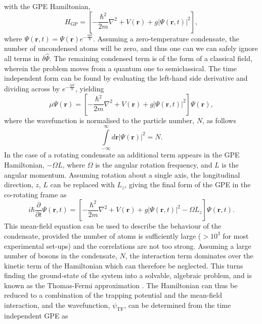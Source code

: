 with the GPE Hamiltonian,
\begin{equation}\label{eqn:h_gp}
H_{\textrm{GP}} = \left[-\frac{\hbar^2}{2m}\nabla^2 + V(\textbf{r}) + g\vert\Psi(\textbf{r},t)\vert^2 \right],
\end{equation}
where $\Psi(\textbf{r},t) = \Psi(\textbf{r})e^{-\frac{i\mu t}{\hbar}}$.
Assuming a zero-temperature condensate, the number of uncondensed atoms will be zero, and thus one can we can safely ignore all terms in $\delta\hat{\Psi}$. The remaining condensed term is of the form of a classical field, wherein the problem moves from a quantum one to semiclassical. The time independent form can be found by evaluating the left-hand side derivative and dividing across by $e^{-\frac{i\mu t}{\hbar}}$, yielding
\begin{equation}
\mu\Psi(\textbf{r}) = \left[-\frac{\hbar^2}{2m}\nabla^2 + V(\textbf{r}) + g\vert\Psi(\textbf{r},t)\vert^2 \right]\Psi(\textbf{r}),
\end{equation}
where the wavefunction is normalised to the particle number, $N$, as follows
\begin{equation}\label{eqn:norm}
\displaystyle\int\limits_{-\infty}^{\infty}d\textbf{r} \left\vert \Psi\left(\textbf{r}\right) \right\vert^2 = N.
\end{equation}
In the case of a rotating condensate an additional term appears in the GPE Hamiltonian, $-\Omega L$, where $\Omega$ is the angular rotation frequency, and $L$ is the angular momentum. Assuming rotation about a single axis, the longitudinal direction, $z$, $L$ can be replaced with $L_z$, giving the final form of the GPE in the co-rotating frame as
\begin{equation}\label{eqn:gpe_rotation}
i\hbar\frac{\partial}{\partial t}\Psi(\textbf{r},t) = \left[-\frac{\hbar^2}{2m}\nabla^2 + V(\textbf{r}) + g\vert\Psi(\textbf{r},t)\vert^2 - \Omega L_z  \right]\Psi(\textbf{r},t).
\end{equation}
This mean-field equation can be used to describe the behaviour of the condensate, provided the number of atoms is sufficiently large ($>10^3$ for most experimental set-ups) and the correlations are not too strong. Assuming a large number of bosons in the condensate, $N$, the interaction term dominates over the kinetic term of the Hamiltonian which can therefore be neglected. This turns finding the ground-state of the system into a solvable, algebraic problem, and is known as the Thomas-Fermi approximation \cite[~p. 84]{BK:Ueda_2010}. The Hamiltonian can thus be reduced to a combination of the trapping potential and the mean-field interaction, and the wavefunction, $\psi_{\textrm{TF}}$, can be determined from the time independent GPE as
